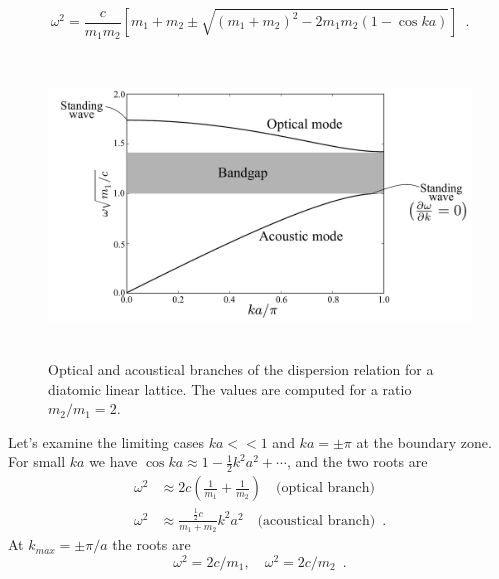 \documentclass[12pt,letterpaper]{article}
\begin{document}
\begin{equation}
\omega^2 = \frac{c}{m_1 m_2} \left[ m_1+m_2 \pm \sqrt{(m_1+m_2)^2-2m_1 m_2(1-\cos ka)}\right] \enspace .
\end{equation}
\begin{figure}[h]
\centering
\includegraphics[height=8cm]{img/diatomic-plot.pdf} 
\caption{Optical and acoustical branches of the dispersion relation for a diatomic linear lattice. The values are computed for a ratio $m_2/m_1 = 2$.}
\end{figure}
Let's examine the limiting cases $ka<<1$ and $ka=\pm \pi$ at the boundary zone. For small $ka$ we have $\cos ka \approx 1 - \frac{1}{2}k^2a^2 + \cdots$, and the two roots are
\begin{align}
\omega^2 &\approx 2c\left(\frac{1}{m_1} + \frac{1}{m_2}\right)\quad \mbox{(optical branch)}\\
\omega^2 &\approx \frac{\frac{1}{2}c}{m_1+m_2}k^2a^2\quad \mbox{(acoustical branch)} \enspace  .
\end{align}
At $k_{max}=\pm\pi/a$ the roots are
\[\omega^2 = 2c/m_1,\quad \omega^2 = 2c/m_2 \enspace .\]
\end{document}
